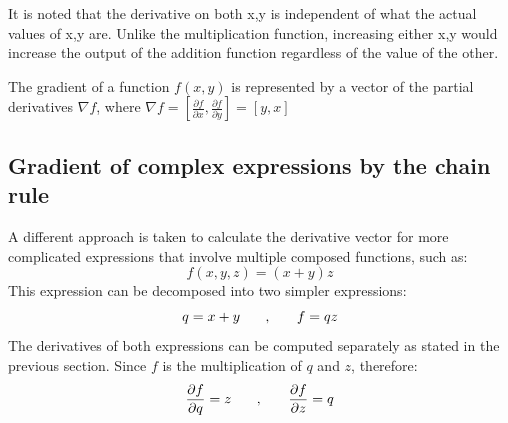 It is noted that the derivative on both x,y is independent of what the actual values of x,y are. Unlike the multiplication function, increasing either x,y would increase the output of the addition function regardless of the value of the other.


The gradient of a function \(f(x,y)\) is represented by a vector of the partial derivatives \(\nabla f\), where \(\nabla f = [\frac{\partial f}{\partial x}, \frac{\partial f}{\partial y}] = [y, x]\)

\subsection{Gradient of complex expressions by the chain rule}
A different approach is taken to calculate the derivative vector for more complicated expressions that involve multiple composed functions, such as:
\begin{equation}
f(x,y,z)=(x+y)z
\label{complex}
\end{equation}
This expression can be decomposed into two simpler expressions: 
\begin{equation}
q=x+y \hspace{0.25in},\hspace{0.25in} f=qz
\end{equation}
The derivatives of both expressions can be computed separately as stated in the previous section. Since \(f\) is the multiplication of \(q\) and \(z\), therefore:
\begin{equation}
\frac{\partial f}{\partial q} = z \hspace{0.25in},\hspace{0.25in} \frac{\partial f}{\partial z} = q
\end{equation}

